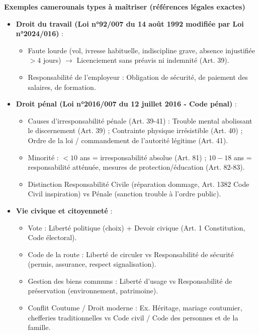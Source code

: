 \documentclass[11pt]{article}
\begin{document}
\begin{aretenir}
\textbf{Exemples camerounais types à maîtriser (références légales exactes)}
\begin{itemize}
  \item \textbf{Droit du travail (Loi n°92/007 du 14 août 1992 modifiée par Loi n°2024/016)} : 
    \begin{itemize}
      \item Faute lourde (vol, ivresse habituelle, indiscipline grave, absence injustifiée $> 4$ jours) $\to$ Licenciement sans préavis ni indemnité (Art. 39).
      \item Responsabilité de l'employeur : Obligation de sécurité, de paiement des salaires, de formation.
    \end{itemize}
  \item \textbf{Droit pénal (Loi n°2016/007 du 12 juillet 2016 - Code pénal)} : 
    \begin{itemize}
      \item Causes d'irresponsabilité pénale (Art. 39-41) : Trouble mental abolissant le discernement (Art. 39) ; Contrainte physique irrésistible (Art. 40) ; Ordre de la loi / commandement de l'autorité légitime (Art. 41).
      \item Minorité : $< 10$ ans = irresponsabilité absolue (Art. 81) ; $10-18$ ans = responsabilité atténuée, mesures de protection/éducation (Art. 82-83).
      \item Distinction Responsabilité Civile (réparation dommage, Art. 1382 Code Civil inspiration) vs Pénale (sanction trouble à l'ordre public).
    \end{itemize}
  \item \textbf{Vie civique et citoyenneté} : 
    \begin{itemize}
      \item Vote : Liberté politique (choix) + Devoir civique (Art. 1 Constitution, Code électoral).
      \item Code de la route : Liberté de circuler vs Responsabilité de sécurité (permis, assurance, respect signalisation).
      \item Gestion des biens communs : Liberté d'usage vs Responsabilité de préservation (environnement, patrimoine).
      \item Conflit Coutume / Droit moderne : Ex. Héritage, mariage coutumier, chefferies traditionnelles vs Code civil / Code des personnes et de la famille.
    \end{itemize}
\end{itemize}

\end{aretenir}
\end{document}
